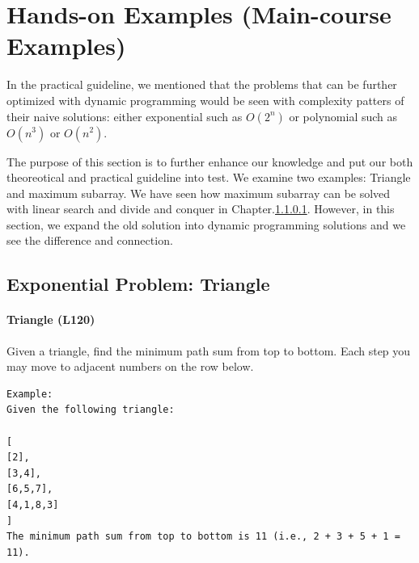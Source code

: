 \documentclass[../main.tex]{subfiles}
\begin{document}
\section{Hands-on Examples (Main-course Examples)}
\label{sec_dynamic_programming_example}

In the practical guideline, we mentioned that the problems that can be further optimized with dynamic programming would be seen with  complexity patters of their naive solutions: either exponential such as $O(2^n)$ or polynomial such as $O(n^3)$ or $O(n^2)$.

The purpose of this section is to further enhance our knowledge and put our both theoreotical and practical guideline into test.  We examine two examples: Triangle and maximum subarray. We have seen how maximum subarray can be solved with linear search and divide and conquer in Chapter.\ref{}. However, in this section, we expand the old solution into dynamic programming solutions and we see the difference and connection. %


\subsection{Exponential Problem: Triangle}
\paragraph{Triangle (L120)} 
Given a triangle, find the minimum path sum from top to bottom. Each step you may move to adjacent numbers on the row below.
\begin{lstlisting}[numbers=none]
Example:
Given the following triangle:

[
[2],
[3,4],
[6,5,7],
[4,1,8,3]
]
The minimum path sum from top to bottom is 11 (i.e., 2 + 3 + 5 + 1 = 11).
\end{lstlisting}

  
\end{document}
